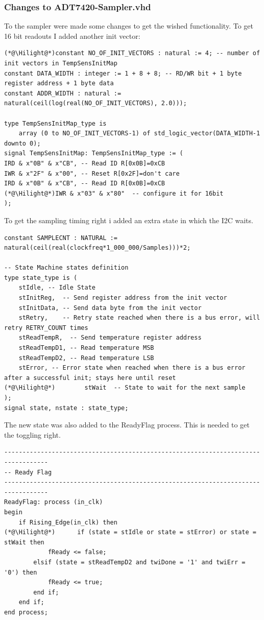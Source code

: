 \documentclass[%
	a4paper,
]
{article}
\begin{document}
\subsubsection{Changes to ADT7420-Sampler.vhd}
To the sampler were made some changes to get the wished functionality.
To get 16 bit readouts I added another init vector:

\lstset{style=vhdl, firstnumber=118}
\begin{lstlisting}
(*@\Hilight@*)constant NO_OF_INIT_VECTORS : natural := 4; -- number of init vectors in TempSensInitMap
constant DATA_WIDTH : integer := 1 + 8 + 8; -- RD/WR bit + 1 byte register address + 1 byte data
constant ADDR_WIDTH : natural := natural(ceil(log(real(NO_OF_INIT_VECTORS), 2.0)));

type TempSensInitMap_type is 
	array (0 to NO_OF_INIT_VECTORS-1) of std_logic_vector(DATA_WIDTH-1 downto 0);
signal TempSensInitMap: TempSensInitMap_type := (
IRD & x"0B" & x"CB", -- Read ID R[0x0B]=0xCB
IWR & x"2F" & x"00", -- Reset R[0x2F]=don't care
IRD & x"0B" & x"CB", -- Read ID R[0x0B]=0xCB
(*@\Hilight@*)IWR & x"03" & x"80"  -- configure it for 16bit
);
\end{lstlisting}

To get the sampling timing right i added an extra state in which the I2C waits.

\lstset{style=vhdl, firstnumber=101}
\begin{lstlisting}
constant SAMPLECNT : NATURAL := natural(ceil(real(clockfreq*1_000_000/Samples)))*2;

-- State Machine states definition
type state_type is (
	stIdle, -- Idle State
	stInitReg,  -- Send register address from the init vector
	stInitData, -- Send data byte from the init vector
	stRetry,    -- Retry state reached when there is a bus error, will retry RETRY_COUNT times
	stReadTempR,  -- Send temperature register address
	stReadTempD1, -- Read temperature MSB
	stReadTempD2, -- Read temperature LSB
	stError, -- Error state when reached when there is a bus error after a successful init; stays here until reset
(*@\Hilight@*)        stWait  -- State to wait for the next sample
);
signal state, nstate : state_type;
\end{lstlisting}

The new state was also added to the ReadyFlag process. This is needed to get the toggling right.

\begin{lstlisting}
----------------------------------------------------------------------------------
-- Ready Flag
----------------------------------------------------------------------------------  
ReadyFlag: process (in_clk)
begin
	if Rising_Edge(in_clk) then
(*@\Hilight@*)		if (state = stIdle or state = stError) or state = stWait then
			fReady <= false;
		elsif (state = stReadTempD2 and twiDone = '1' and twiErr = '0') then
			fReady <= true;
		end if;
	end if;
end process;
\end{lstlisting}
\end{document}
